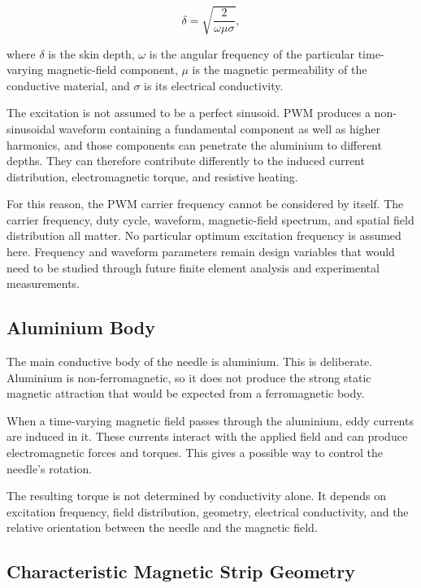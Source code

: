 \documentclass[12pt, a4paper]{article}
\begin{document}
\begin{equation}
\delta=\sqrt{\frac{2}{\omega\mu\sigma}},
\end{equation}

where $\delta$ is the skin depth, $\omega$ is the angular frequency of the particular time-varying magnetic-field component, $\mu$ is the magnetic permeability of the conductive material, and $\sigma$ is its electrical conductivity.

The excitation is not assumed to be a perfect sinusoid. PWM produces a non-sinusoidal waveform containing a fundamental component as well as higher harmonics, and those components can penetrate the aluminium to different depths. They can therefore contribute differently to the induced current distribution, electromagnetic torque, and resistive heating.

For this reason, the PWM carrier frequency cannot be considered by itself. The carrier frequency, duty cycle, waveform, magnetic-field spectrum, and spatial field distribution all matter. No particular optimum excitation frequency is assumed here. Frequency and waveform parameters remain design variables that would need to be studied through future finite element analysis and experimental measurements.

\subsection{Aluminium Body}

The main conductive body of the needle is aluminium. This is deliberate. Aluminium is non-ferromagnetic, so it does not produce the strong static magnetic attraction that would be expected from a ferromagnetic body.

When a time-varying magnetic field passes through the aluminium, eddy currents are induced in it. These currents interact with the applied field and can produce electromagnetic forces and torques. This gives a possible way to control the needle's rotation.

The resulting torque is not determined by conductivity alone. It depends on excitation frequency, field distribution, geometry, electrical conductivity, and the relative orientation between the needle and the magnetic field.

\subsection{Characteristic Magnetic Strip Geometry}
\end{document}
